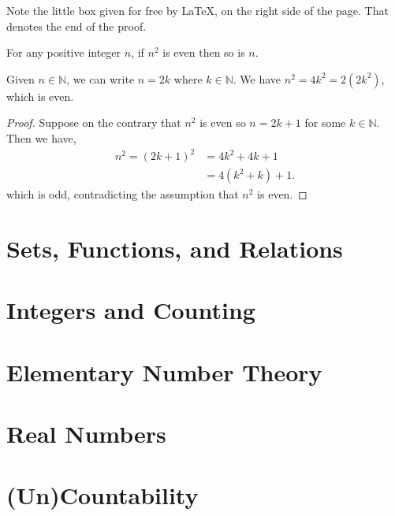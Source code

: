 \documentclass[12pt]{article}
\begin{document}
Note the little box given for free by \LaTeX, on the right side of the page.
That denotes the end of the proof.

\begin{theorem}
    For any positive integer $n$, if $n^{2}$ is even then so is $n$.
\end{theorem}
\begin{nonproof}
    Given $n \in \mathbb{N}$, we can write $n = 2k$ where $k \in \mathbb{N}$.
    We have $n^{2} = 4k^{2} = 2(2k^{2})$, which is even.
\end{nonproof}

\begin{proof}
    Suppose on the contrary that $n^{2}$ is even so $n = 2k+1$ for some $k \in \mathbb{N}$.
    Then we have,
    \[
    \begin{aligned}
        n^{2} = (2k+1)^{2} &= 4k^{2} + 4k + 1 \\
                     &= 4(k^{2} + k) + 1.
    \end{aligned}
    \]
    which is odd, contradicting the assumption that $n^{2}$ is even.
    \contra
\end{proof}

\section{Sets, Functions, and Relations}
\section{Integers and Counting}
\section{Elementary Number Theory}
\section{Real Numbers}
\section{(Un)Countability}
\end{document}
